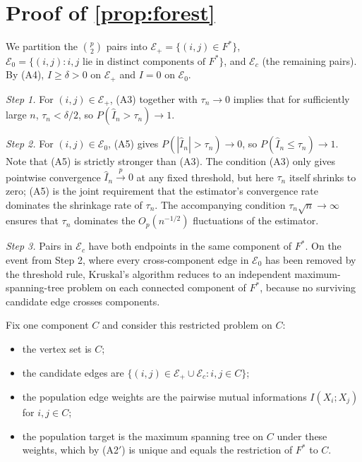 \section{\texorpdfstring{Proof of \cref{prop:forest}}{Proof of Proposition 2}}
\label{app:prop2}

We partition the $\binom{p}{2}$ pairs into
$\mathcal{E}_+ = \{(i,j) \in F^*\}$,
$\mathcal{E}_0 = \{(i,j): i, j \text{ lie in distinct components of } F^*\}$,
and $\mathcal{E}_c$ (the remaining pairs). By (A4),
$I \ge \delta > 0$ on $\mathcal{E}_+$ and $I = 0$ on $\mathcal{E}_0$.

\emph{Step 1.} For $(i,j) \in \mathcal{E}_+$, (A3) together with
$\tau_n \to 0$ implies that for sufficiently large $n$,
$\tau_n < \delta/2$, so $P(\hat{I}_n > \tau_n) \to 1$.

\emph{Step 2.} For $(i,j) \in \mathcal{E}_0$, (A5) gives
$P(|\hat{I}_n| > \tau_n) \to 0$, so $P(\hat{I}_n \le \tau_n) \to 1$.
Note that (A5) is strictly stronger than (A3). The condition
(A3) only gives pointwise convergence $\hat{I}_n
\overset{p}{\to} 0$ at any fixed threshold, but here $\tau_n$
itself shrinks to zero; (A5) is the joint requirement that the
estimator's convergence rate dominates the shrinkage rate of
$\tau_n$. The accompanying condition $\tau_n \sqrt{n} \to \infty$
ensures that $\tau_n$ dominates the $O_p(n^{-1/2})$ fluctuations
of the estimator.

\emph{Step 3.} Pairs in $\mathcal{E}_c$ have both endpoints in
the same component of $F^*$. On the event from Step 2, where
every cross-component edge in $\mathcal{E}_0$ has been removed by
the threshold rule, Kruskal's algorithm reduces to an
independent maximum-spanning-tree problem on each connected
component of $F^*$, because no surviving candidate edge crosses
components.

Fix one component $C$ and consider this restricted problem on
$C$:
\begin{itemize}
\item the vertex set is $C$;
\item the candidate edges are
$\{(i,j) \in \mathcal{E}_+ \cup \mathcal{E}_c : i, j \in C\}$;
\item the population edge weights are the pairwise mutual
informations $I(X_i; X_j)$ for $i, j \in C$;
\item the population target is the maximum spanning tree on $C$
under these weights, which by (A2$'$) is unique and equals the
restriction of $F^*$ to $C$.
\end{itemize}


